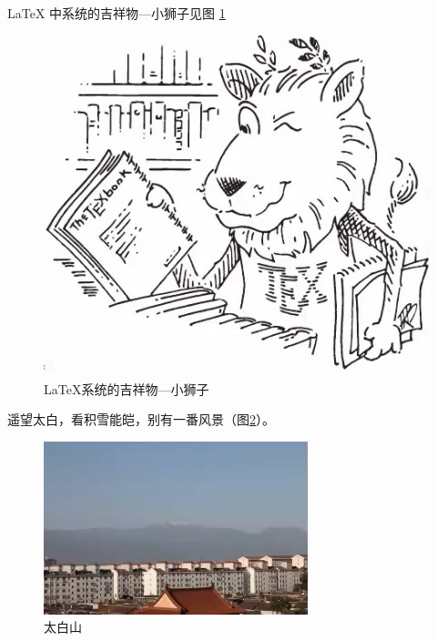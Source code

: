 \documentclass{ctexart}
\begin{document}
    \LaTeX{} 中系统的吉祥物---小狮子见图 \ref{fig-lion}
    \begin{figure}[h]
        \centering
        \includegraphics[scale=0.3]{lion.jpg}
        \caption{\LaTeX 系统的吉祥物---小狮子} \label{fig-lion}
    \end{figure}

    遥望太白，看积雪能皑，别有一番风景（图\ref{fig-mountain}）。
    \begin{figure}[h]
        \centering
        \includegraphics[scale=0.5]{mountain.jpg}
        \caption{太白山} \label{fig-mountain}
    \end{figure}
\end{document}

